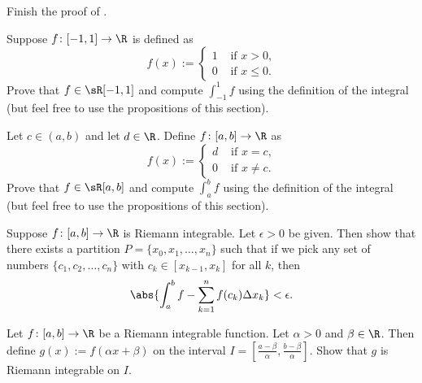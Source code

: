 \documentclass[12pt]{book}
\begin{document}
\begin{exercise}
Finish the proof of .
\end{exercise}

\begin{exercise}
Suppose $f \colon [-1,1] \to \R$ is defined as
\begin{equation*}
f(x) :=
\begin{cases}
1 & \text{ if $x > 0$,} \\
0 & \text{ if $x \leq 0$.}
\end{cases}
\end{equation*}
Prove that $f \in \sR[-1,1]$ and
compute $\int_{-1}^1 f$ using the definition of the integral
(but
feel free to use the propositions of this section).
\end{exercise}

\begin{exercise}
Let $c \in (a,b)$ and let $d \in \R$.
Define $f \colon [a,b] \to \R$ as
\begin{equation*}
f(x) :=
\begin{cases}
d & \text{ if $x = c$,} \\
0 & \text{ if $x \not= c$.}
\end{cases}
\end{equation*}
Prove that $f \in \sR[a,b]$ and
compute
$\int_a^b f$ using the definition of the integral
(but
feel free to use the propositions of this section).
\end{exercise}

\begin{exercise} \label{exercise:taggedpartition}
Suppose $f \colon [a,b] \to \R$ is Riemann integrable.
Let $\epsilon
> 0$ be given.
Then show that there exists a partition $P = \{ x_0, x_1,
\ldots, x_n \}$
such that if we
pick any set of numbers $\{ c_1, c_2, \ldots, c_n \}$ with
$c_k \in [x_{k-1},x_k]$ for all $k$, then
\begin{equation*}
\abs{\int_a^b f - \sum_{k=1}^n f(c_k) \Delta x_k} < \epsilon .
\end{equation*}
\end{exercise}

\begin{exercise}
Let $f \colon [a,b] \to \R$ be a Riemann integrable function.
Let $\alpha > 0$ and $\beta \in \R$.
Then define $g(x) := f(\alpha x + \beta)$ on the interval
$I = [\frac{a-\beta}{\alpha}, \frac{b-\beta}{\alpha}]$.
Show
that $g$ is Riemann integrable on $I$.
\end{exercise}
\end{document}
